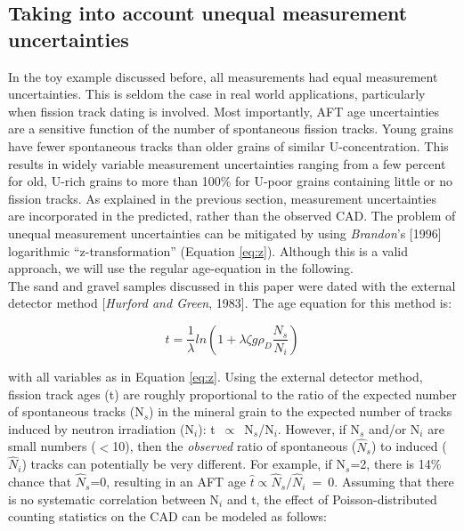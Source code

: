 \documentclass[12pt,twoside]{article}
\begin{document}
\subsection{Taking into account unequal measurement uncertainties}
\label{sec:unequal}

In  the  toy example  discussed  before,  all  measurements had  equal
measurement  uncertainties. This  is  seldom the  case  in real  world
applications,  particularly when  fission  track dating  is involved.  
Most importantly,  AFT age uncertainties  are a sensitive  function of
the  number of spontaneous  fission tracks.   Young grains  have fewer
spontaneous tracks than older grains of similar U-concentration.  This
results in  widely variable  measurement uncertainties ranging  from a
few  percent for  old, U-rich  grains to  more than  100\%  for U-poor
grains containing  little or no  fission tracks.  As explained  in the
previous  section, measurement uncertainties  are incorporated  in the
predicted,  rather than  the  observed CAD.   The  problem of  unequal
measurement uncertainties  can be  mitigated by using  {\it Brandon}'s
[1996]   logarithmic  ``z-transformation''   (Equation   \ref{eq:z}).  
Although  this  is   a  valid  approach,  we  will   use  the  regular
age-equation in the following.
\\

The sand  and gravel samples discussed  in this paper  were dated with
the external detector method [{\it  Hurford and Green}, 1983]. The age
equation for this method is:

\begin{equation}
  \label{eq:EDTageEquation}
  t =  \frac{1}{\lambda}ln\left( 1+ \lambda \zeta  g \rho_D \frac{N_s}{N_i} \right)
\end{equation}

with  all variables  as in  Equation \ref{eq:z}.   Using  the external
detector method,  fission track ages  (t) are roughly  proportional to
the ratio of the expected  number of spontaneous tracks (N$_s$) in the
mineral  grain to  the expected  number of  tracks induced  by neutron
irradiation  (N$_i$):   t~$\propto$~N$_s$/N$_i$.   However,  if  N$_s$
and/or N$_i$ are small numbers  ($<$10), then the {\it observed} ratio
of  spontaneous  ($\hat{N}_s$)  to  induced ($\hat{N}_i$)  tracks  can
potentially be very different.  For example, if N$_s$=2, there is 14\%
chance    that    $\hat{N}_s$=0,    resulting    in   an    AFT    age
$\hat{t}\propto\hat{N}_s/\hat{N}_i$~=~0.   Assuming that  there  is no
systematic   correlation  between   N$_i$   and  t,   the  effect   of
Poisson-distributed counting  statistics on the CAD can  be modeled as
follows:
\end{document}
